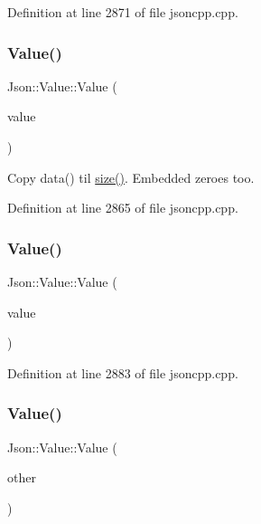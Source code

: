 Definition at line 2871 of file jsoncpp.\+cpp.

\hypertarget{class_json_1_1_value_a89ef37969ff7c6eb3a7afcca03d4cd4a}{}\label{class_json_1_1_value_a89ef37969ff7c6eb3a7afcca03d4cd4a} 
\subsubsection{\texorpdfstring{Value()}{Value()}\hspace{0.1cm}{\footnotesize\ttfamily [10/24]}}
{\footnotesize\ttfamily Json\+::\+Value\+::\+Value (\begin{DoxyParamCaption}\item[{const \hyperlink{config_8h_a1e723f95759de062585bc4a8fd3fa4be}{J\+S\+O\+N\+C\+P\+P\+\_\+\+S\+T\+R\+I\+NG} \&}]{value }\end{DoxyParamCaption})}



Copy data() til \hyperlink{class_json_1_1_value_a0ec2808e1d7efa4e9fad938d6667be44}{size()}. Embedded zeroes too. 



Definition at line 2865 of file jsoncpp.\+cpp.

\hypertarget{class_json_1_1_value_a350a31ea4a30d384994b0bc010b17495}{}\label{class_json_1_1_value_a350a31ea4a30d384994b0bc010b17495} 
\subsubsection{\texorpdfstring{Value()}{Value()}\hspace{0.1cm}{\footnotesize\ttfamily [11/24]}}
{\footnotesize\ttfamily Json\+::\+Value\+::\+Value (\begin{DoxyParamCaption}\item[{bool}]{value }\end{DoxyParamCaption})}



Definition at line 2883 of file jsoncpp.\+cpp.

\hypertarget{class_json_1_1_value_a436dfd3670f95fd665f680eba5cebcf0}{}\label{class_json_1_1_value_a436dfd3670f95fd665f680eba5cebcf0} 
\subsubsection{\texorpdfstring{Value()}{Value()}\hspace{0.1cm}{\footnotesize\ttfamily [12/24]}}
{\footnotesize\ttfamily Json\+::\+Value\+::\+Value (\begin{DoxyParamCaption}\item[{const \hyperlink{class_json_1_1_value}{Value} \&}]{other }\end{DoxyParamCaption})}



